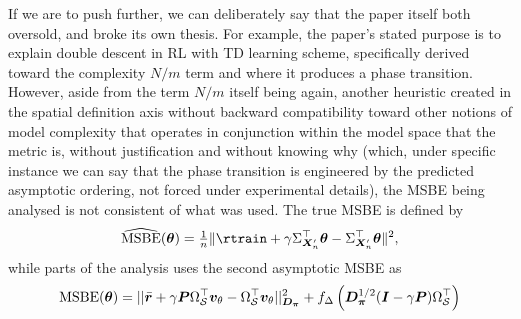 If we are to push further, we can deliberately say that the paper itself both oversold, and broke its own thesis. For example, the paper's stated purpose is to explain double descent in RL with TD learning scheme, specifically derived toward the complexity $N/m$ term and where it produces a phase transition. However, aside from the term $N/m$ itself being again, another heuristic created in the spatial definition axis without backward compatibility toward other notions of model complexity that operates in conjunction within the model space that the metric is, without justification and without knowing why (which, under specific instance we can say that the phase transition is engineered by the predicted asymptotic ordering, not forced under experimental details), the MSBE being analysed is not consistent of what was used. The true MSBE is defined by 
\begin{equation}
    \widehat{\operatorname{MSBE}}(\vtheta) = \tfrac{1}{n} \lVert \rtrain + \gamma \Sigma^{\top}_{\bm{X}_{n}'} \vtheta - \Sigma^{\top}_{\bm{X}_{n}'}\vtheta \rVert^2,
    \label{def:MSBE_train}
\end{equation}
while parts of the analysis uses the second asymptotic MSBE as 
\begin{equation}
    \operatorname{MSBE}({\bm{\theta}}) = \lvert \lvert \bar{\bm{r}} + \gamma \bm{P} \Omega_{\mathcal{S}}^{\top}\bm{v}_{\theta}- \Omega_{\mathcal{S}}^{\top} \bm{v}_{\theta}\rvert \rvert^{2}_{\bm{D}_{\bm{\pi}}} + f_{\Delta} \left(\bm{D}_{\bm{\pi}}^{1/2}(\bm{I}-\gamma\bm{P})\Omega^{\top}_{\mathcal{S}}\right)
\end{equation}
